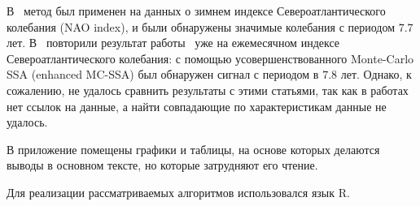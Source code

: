 \documentclass[specialist,
substylefile = spbu_report.rtx,
subf,href,colorlinks=true, 12pt]{disser}
\theoremstyle{definition}
\begin{document}
  В~\cite{NAO} метод был применен на данных о зимнем индексе Североатлантического колебания (NAO index), и были обнаружены значимые колебания с периодом $7.7$ лет. В~\cite{Enchanced_mcssa} повторили результат работы~\cite{NAO} уже на ежемесячном индексе Североатлантического колебания: с помощью усовершенствованного Monte-Carlo SSA (enhanced MC-SSA) был обнаружен сигнал с периодом в $7.8$ лет.
Однако, к сожалению, не удалось сравнить результаты с этими статьями, так как в работах нет ссылок на данные, а найти совпадающие по характеристикам данные не удалось.
 
В приложение помещены графики и таблицы, на основе которых делаются выводы в основном тексте, но которые затрудняют его чтение.

Для реализации рассматриваемых алгоритмов использовался язык R.



\end{document}
